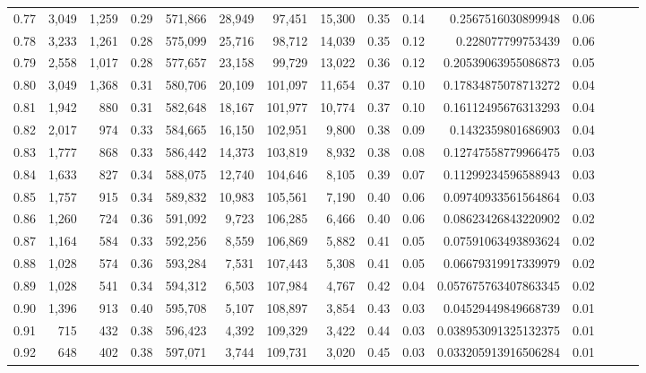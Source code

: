 \begin{tabular}{rrrrrrrrrrrrrrr}
0.77 &   3,049 &  1,259 &  0.29 &  571,866 &   28,949 &   97,451 &   15,300 &  0.35 &  0.14 &    0.2567516030899948 &      0.06 \\
0.78 &   3,233 &  1,261 &  0.28 &  575,099 &   25,716 &   98,712 &   14,039 &  0.35 &  0.12 &     0.228077799753439 &      0.06 \\
0.79 &   2,558 &  1,017 &  0.28 &  577,657 &   23,158 &   99,729 &   13,022 &  0.36 &  0.12 &   0.20539063955086873 &      0.05 \\
0.80 &   3,049 &  1,368 &  0.31 &  580,706 &   20,109 &  101,097 &   11,654 &  0.37 &  0.10 &   0.17834875078713272 &      0.04 \\
0.81 &   1,942 &    880 &  0.31 &  582,648 &   18,167 &  101,977 &   10,774 &  0.37 &  0.10 &   0.16112495676313293 &      0.04 \\
0.82 &   2,017 &    974 &  0.33 &  584,665 &   16,150 &  102,951 &    9,800 &  0.38 &  0.09 &    0.1432359801686903 &      0.04 \\
0.83 &   1,777 &    868 &  0.33 &  586,442 &   14,373 &  103,819 &    8,932 &  0.38 &  0.08 &   0.12747558779966475 &      0.03 \\
0.84 &   1,633 &    827 &  0.34 &  588,075 &   12,740 &  104,646 &    8,105 &  0.39 &  0.07 &   0.11299234596588943 &      0.03 \\
0.85 &   1,757 &    915 &  0.34 &  589,832 &   10,983 &  105,561 &    7,190 &  0.40 &  0.06 &   0.09740933561564864 &      0.03 \\
0.86 &   1,260 &    724 &  0.36 &  591,092 &    9,723 &  106,285 &    6,466 &  0.40 &  0.06 &   0.08623426843220902 &      0.02 \\
0.87 &   1,164 &    584 &  0.33 &  592,256 &    8,559 &  106,869 &    5,882 &  0.41 &  0.05 &   0.07591063493893624 &      0.02 \\
0.88 &   1,028 &    574 &  0.36 &  593,284 &    7,531 &  107,443 &    5,308 &  0.41 &  0.05 &   0.06679319917339979 &      0.02 \\
0.89 &   1,028 &    541 &  0.34 &  594,312 &    6,503 &  107,984 &    4,767 &  0.42 &  0.04 &  0.057675763407863345 &      0.02 \\
0.90 &   1,396 &    913 &  0.40 &  595,708 &    5,107 &  108,897 &    3,854 &  0.43 &  0.03 &   0.04529449849668739 &      0.01 \\
0.91 &     715 &    432 &  0.38 &  596,423 &    4,392 &  109,329 &    3,422 &  0.44 &  0.03 &  0.038953091325132375 &      0.01 \\
0.92 &     648 &    402 &  0.38 &  597,071 &    3,744 &  109,731 &    3,020 &  0.45 &  0.03 &  0.033205913916506284 &      0.01 \\

\end{tabular}
